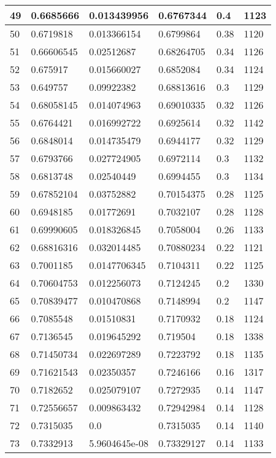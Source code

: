\begin{longtable}{|l|l|l|l|l|l|}
49 & 0.6685666 & 0.013439956 & 0.6767344 & 0.4 & 1123 \\ \hline 
50 & 0.6719818 & 0.013366154 & 0.6799864 & 0.38 & 1120 \\ \hline 
51 & 0.66606545 & 0.02512687 & 0.68264705 & 0.34 & 1126 \\ \hline 
52 & 0.675917 & 0.015660027 & 0.6852084 & 0.34 & 1124 \\ \hline 
53 & 0.649757 & 0.09922382 & 0.68813616 & 0.3 & 1129 \\ \hline 
54 & 0.68058145 & 0.014074963 & 0.69010335 & 0.32 & 1126 \\ \hline 
55 & 0.6764421 & 0.016992722 & 0.6925614 & 0.32 & 1142 \\ \hline 
56 & 0.6848014 & 0.014735479 & 0.6944177 & 0.32 & 1129 \\ \hline 
57 & 0.6793766 & 0.027724905 & 0.6972114 & 0.3 & 1132 \\ \hline 
58 & 0.6813748 & 0.02540449 & 0.6994455 & 0.3 & 1134 \\ \hline 
59 & 0.67852104 & 0.03752882 & 0.70154375 & 0.28 & 1125 \\ \hline 
60 & 0.6948185 & 0.01772691 & 0.7032107 & 0.28 & 1128 \\ \hline 
61 & 0.69990605 & 0.018326845 & 0.7058004 & 0.26 & 1133 \\ \hline 
62 & 0.68816316 & 0.032014485 & 0.70880234 & 0.22 & 1121 \\ \hline 
63 & 0.7001185 & 0.0147706345 & 0.7104311 & 0.22 & 1125 \\ \hline 
64 & 0.70604753 & 0.012256073 & 0.7124245 & 0.2 & 1330 \\ \hline 
65 & 0.70839477 & 0.010470868 & 0.7148994 & 0.2 & 1147 \\ \hline 
66 & 0.7085548 & 0.01510831 & 0.7170932 & 0.18 & 1124 \\ \hline 
67 & 0.7136545 & 0.019645292 & 0.719504 & 0.18 & 1338 \\ \hline 
68 & 0.71450734 & 0.022697289 & 0.7223792 & 0.18 & 1135 \\ \hline 
69 & 0.71621543 & 0.02350357 & 0.7246166 & 0.16 & 1317 \\ \hline 
70 & 0.7182652 & 0.025079107 & 0.7272935 & 0.14 & 1147 \\ \hline 
71 & 0.72556657 & 0.009863432 & 0.72942984 & 0.14 & 1128 \\ \hline 
72 & 0.7315035 & 0.0 & 0.7315035 & 0.14 & 1140 \\ \hline 
73 & 0.7332913 & 5.9604645e-08 & 0.73329127 & 0.14 & 1133 \\ \hline 

\end{longtable}

